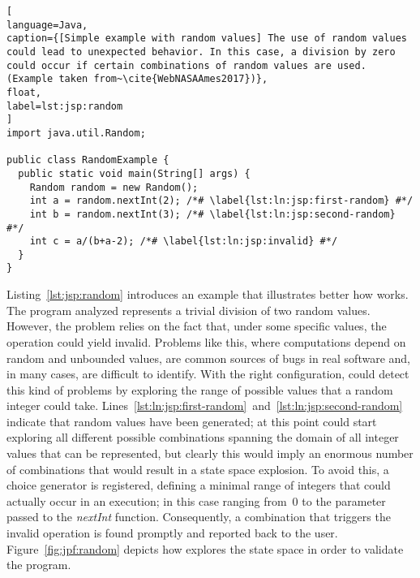 \begin{lstlisting}[
language=Java,
caption={[Simple example with random values] The use of random values could lead to unexpected behavior. In this case, a division by zero could occur if certain combinations of random values are used. (Example taken from~\cite{WebNASAAmes2017})},
float,
label=lst:jsp:random
]
import java.util.Random;

public class RandomExample {
  public static void main(String[] args) {
    Random random = new Random();
    int a = random.nextInt(2); /*# \label{lst:ln:jsp:first-random} #*/
    int b = random.nextInt(3); /*# \label{lst:ln:jsp:second-random} #*/
    int c = a/(b+a-2); /*# \label{lst:ln:jsp:invalid} #*/
  }
}
\end{lstlisting}

Listing~\ref{lst:jsp:random} introduces an example that illustrates better how  works. The program analyzed represents a trivial division of two random values. However, the problem relies on the fact that, under some specific values, the operation could yield invalid. Problems like this, where computations depend on random and unbounded values, are common sources of bugs in real software and, in many cases, are difficult to identify. With the right configuration,  could detect this kind of problems by exploring the range of possible values that a random integer could take. Lines~\ref{lst:ln:jsp:first-random}~and~\ref{lst:ln:jsp:second-random} indicate that random values have been generated; at this point  could start exploring all different possible combinations spanning the domain of all integer values that can be represented, but clearly this would imply an enormous number of combinations that would result in a state space explosion. To avoid this, a choice generator is registered, defining a minimal range of integers that could actually occur in an execution; in this case ranging from~0 to the parameter passed to the \textit{nextInt} function. Consequently, a combination that triggers the invalid operation is found promptly and reported back to the user. Figure~\ref{fig:jpf:random} depicts how \jpf explores the state space in order to validate the program.


